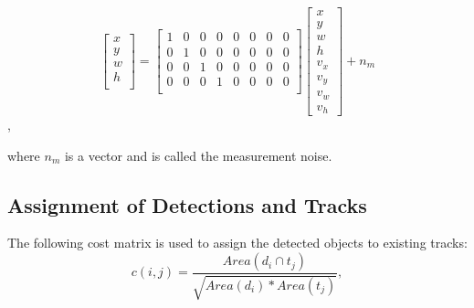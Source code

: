 \documentclass[conference]{IEEEtran}
\begin{document}
\[
\begin{bmatrix}
x \\
y \\
w \\
h \\
\end{bmatrix}
=
\begin{bmatrix}
1 &0 & 0 & 0  & 0 & 0 &0 &0 \\
0 &1 & 0 & 0  & 0 & 0 &0 &0 \\
0 &0 & 1 & 0  & 0 & 0 &0 &0 \\
0 &0 & 0 & 1  & 0 & 0 &0 &0 \\

\end{bmatrix}
\begin{bmatrix}
x \\
y \\
w \\
h \\
v_x \\
v_y \\
v_w \\
v_h
\end{bmatrix}+n_m
\],

where $n_m$ is a vector and is called the measurement noise. 


\subsection{Assignment of Detections and Tracks}

The following cost matrix is used to assign the detected objects to existing tracks:
\begin{equation}\nonumber
c(i,j)= \frac{Area(d_i\cap t_j)}{\sqrt{Area(d_i)*Area(t_j)}},
\end{equation}
\end{document}
